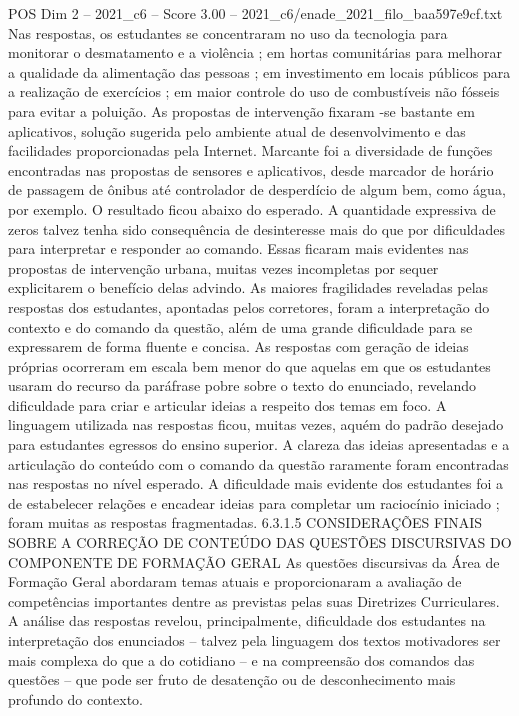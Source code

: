 \begin{textsample}{POS Dim 2 – 2021\_c6 – Score 3.00 – 2021\_c6/enade\_2021\_filo\_baa597e9cf.txt}
Nas respostas, os estudantes se concentraram no uso da tecnologia para monitorar o desmatamento e a violência ; em hortas comunitárias para melhorar a qualidade da alimentação das pessoas ; em investimento em locais públicos para a realização de exercícios ; em maior controle do uso de combustíveis não fósseis para evitar a poluição.
As propostas de intervenção fixaram -se bastante em aplicativos, solução sugerida pelo ambiente atual de desenvolvimento e das facilidades proporcionadas pela Internet.
Marcante foi a diversidade de funções encontradas nas propostas de sensores e aplicativos, desde marcador de horário de passagem de ônibus até controlador de desperdício de algum bem, como água, por exemplo.
O resultado ficou abaixo do esperado.
A quantidade expressiva de zeros talvez tenha sido consequência de desinteresse mais do que por dificuldades para interpretar e responder ao comando.
Essas ficaram mais evidentes nas propostas de intervenção urbana, muitas vezes incompletas por sequer explicitarem o benefício delas advindo.
As maiores fragilidades reveladas pelas respostas dos estudantes, apontadas pelos corretores, foram a interpretação do contexto e do comando da questão, além de uma grande dificuldade para se expressarem de forma fluente e concisa.
As respostas com geração de ideias próprias ocorreram em escala bem menor do que aquelas em que os estudantes usaram do recurso da paráfrase pobre sobre o texto do enunciado, revelando dificuldade para criar e articular ideias a respeito dos temas em foco.
A linguagem utilizada nas respostas ficou, muitas vezes, aquém do padrão desejado para estudantes egressos do ensino superior.
A clareza das ideias apresentadas e a articulação do conteúdo com o comando da questão raramente foram encontradas nas respostas no nível esperado.
A dificuldade mais evidente dos estudantes foi a de estabelecer relações e encadear ideias para completar um raciocínio iniciado ; foram muitas as respostas fragmentadas. 6.3.1.5 CONSIDERAÇÕES FINAIS SOBRE A CORREÇÃO DE CONTEÚDO DAS QUESTÕES DISCURSIVAS DO COMPONENTE DE FORMAÇÃO GERAL As questões discursivas da Área de Formação Geral abordaram temas atuais e proporcionaram a avaliação de competências importantes dentre as previstas pelas suas Diretrizes Curriculares.
A análise das respostas revelou, principalmente, dificuldade dos estudantes na interpretação dos enunciados – talvez pela linguagem dos textos motivadores ser mais complexa do que a do cotidiano – e na compreensão dos comandos das questões – que pode ser fruto de desatenção ou de desconhecimento mais profundo do contexto.

\end{textsample}
